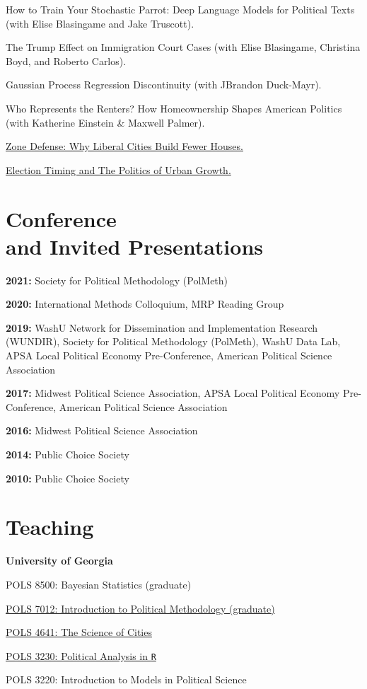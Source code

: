 \documentclass[margin,line]{res}
\newenvironment{list1}{
  \begin{list}{}{%
      \setlength{\itemsep}{0.1in}
      \setlength{\parsep}{0in} \setlength{\parskip}{0in}
      \setlength{\topsep}{0.1in} \setlength{\partopsep}{0in} 
      \setlength{\leftmargin}{0.17in}}}{\end{list}}
\newenvironment{publist}{
	\begin{list}{}{%
			\setlength{\itemsep}{0.15in}
			\setlength{\parsep}{0in} \setlength{\parskip}{0in}
			\setlength{\topsep}{0in} \setlength{\partopsep}{0in} 
			\setlength{\leftmargin}{0.15in}
			\setlength{\itemindent}{-0.15in}}}
		{\end{list}}
\begin{document}
\begin{resume}
\begin{publist}
	\item How to Train Your Stochastic Parrot: Deep Language Models for Political Texts (with Elise Blasingame and Jake Truscott).
	\item The Trump Effect on Immigration Court Cases (with Elise Blasingame, Christina Boyd, and Roberto Carlos).
	\item Gaussian Process Regression Discontinuity (with JBrandon Duck-Mayr).
	\item Who Represents the Renters? How Homeownership Shapes American Politics (with Katherine Einstein \& Maxwell Palmer). 
	\item \href{https://joeornstein.github.io/publications/ornstein-zone-defense.pdf}{Zone Defense: Why Liberal Cities Build Fewer Houses.}
	\item \href{https://joeornstein.github.io/publications/Ornstein-ElectionTiming.pdf}{Election Timing and The Politics of Urban Growth.}
\end{publist}

\section{\sc Conference \\and Invited Presentations}

\textbf{2021:} Society for Political Methodology (PolMeth)

\textbf{2020:} International Methods Colloquium, MRP Reading Group

\textbf{2019:} WashU Network for Dissemination and Implementation Research (WUNDIR), Society for Political Methodology (PolMeth), WashU Data Lab, APSA Local Political Economy Pre-Conference, American Political Science Association

\textbf{2017:} Midwest Political Science Association, APSA Local Political Economy Pre-Conference, American Political Science Association

\textbf{2016:} Midwest Political Science Association

\textbf{2014:} Public Choice Society

\textbf{2010:} Public Choice Society


\section{\sc Teaching}


\textbf{University of Georgia}
\begin{list1}
	\item[] POLS 8500: Bayesian Statistics (graduate)
	\item[] \href{https://joeornstein.github.io/pols-7012//}{POLS 7012: Introduction to Political Methodology (graduate)}
	\item[] \href{https://joeornstein.github.io/pols-4641/}{POLS 4641: The Science of Cities}
	\item[] \href{https://joeornstein.github.io/pols-3230/}{POLS 3230: Political Analysis in \texttt{R}}
	\item[] POLS 3220: Introduction to Models in Political Science
\end{list1}


\end{resume}
\end{document}

